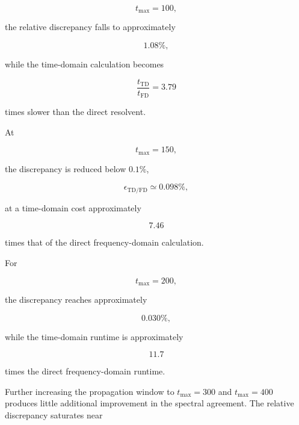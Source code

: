 \documentclass[11pt]{article}
\begin{document}
\begin{equation}
t_{\max}=100,
\end{equation}

the relative discrepancy falls to approximately

\begin{equation}
1.08\%,
\end{equation}

while the time-domain calculation becomes

\begin{equation}
\frac{t_{\mathrm{TD}}}{t_{\mathrm{FD}}}
=
3.79
\end{equation}

times slower than the direct resolvent.

At

\begin{equation}
t_{\max}=150,
\end{equation}

the discrepancy is reduced below $0.1\%$,

\begin{equation}
\epsilon_{\mathrm{TD/FD}}
\simeq
0.098\%,
\end{equation}

at a time-domain cost approximately

\begin{equation}
7.46
\end{equation}

times that of the direct frequency-domain calculation.

For

\begin{equation}
t_{\max}=200,
\end{equation}

the discrepancy reaches approximately

\begin{equation}
\boxed{
0.030\%,
}
\end{equation}

while the time-domain runtime is approximately

\begin{equation}
\boxed{
11.7
}
\end{equation}

times the direct frequency-domain runtime.

Further increasing the propagation window to $t_{\max}=300$ and
$t_{\max}=400$ produces little additional improvement in the spectral
agreement.  The relative discrepancy saturates near
\end{document}
